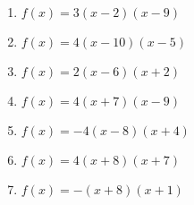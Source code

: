 \documentclass{article}%
\begin{document}
\begin{enumerate}[label=\alph*)]
\item%
\newline\vspace{0.5cm} $f(x)=3(x-2)(x-9)$%
\item%
\newline\vspace{0.5cm} $f(x)=4(x-10)(x-5)$%
\item%
\newline\vspace{0.5cm} $f(x)=2(x-6)(x+2)$%
\item%
\newline\vspace{0.5cm} $f(x)=4(x+7)(x-9)$%
\item%
\newline\vspace{0.5cm} $f(x)=-4(x-8)(x+4)$%
\item%
\newline\vspace{0.5cm} $f(x)=4(x+8)(x+7)$%
\item%
\newline\vspace{0.5cm} $f(x)=-(x+8)(x+1)$%
\end{enumerate}

%
\end{document}
